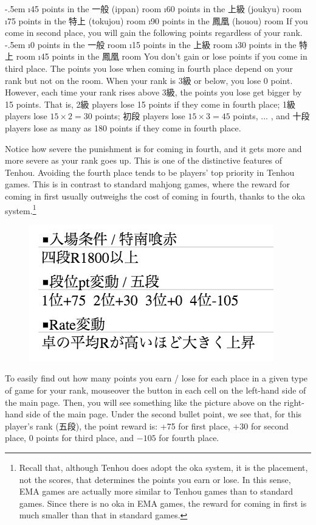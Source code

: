 \bi \itemsep-.5em
	\i 45 points in the 一般 ({\jap ippan}) room
	\i 60 points in the 上級 ({\jap joukyu}) room
	\i 75 points in the 特上 ({\jap tokujou}) room
	\i 90 points in the 鳳凰 ({\jap houou}) room
\ei
If you come in second place, you will gain the following points regardless of your rank.
	\bi \itemsep-.5em
	\i 0 points in the 一般 room
	\i 15 points in the 上級 room
	\i 30 points in the 特上 room
	\i 45 points in the 鳳凰 room
\ei
You don't gain or lose points if you come in third place. 
The points you lose when coming in fourth place depend on your rank but not on the room. When your rank is 3級 or below, you lose 0 point. However, each time your rank rises above 3級, the points you lose get bigger by 15 points. 
That is, 2級 players lose 15 points if they come in fourth place; 1級 players lose $15 \times 2 = 30$ points; 初段 players lose $15 \times 3 = 45$ points, ... , and 十段 players lose as many as 180 points if they come in fourth place.

\bigskip
Notice how severe the punishment is for coming in fourth, and it gets more and more severe as your rank goes up. This is one of the distinctive features of {\jap Tenhou}. 
Avoiding the fourth place tends to be players' top priority in {\jap Tenhou} games. This is in contrast to standard mahjong games, where the reward for coming in first usually outweighs the cost of coming in fourth, thanks to the {\jap oka} system.\footnote{Recall that, although {\jap Tenhou} does adopt the {\jap oka} system, it is the placement, not the scores, that determines the points you earn or lose. In this sense, EMA games are actually more similar to {\jap Tenhou} games than to standard games. Since there is no {\jap oka} in EMA games, the reward for coming in first is much smaller than that in standard games.} 

\bigskip

\begin{figure}
\vspace{-10pt}
\begin{center}
\includegraphics[width=.45\textwidth,clip]{figs/pt}
\end{center}
\vspace{-20pt}
\end{figure}
To easily find out how many points you earn / lose for each place in a given type of game for your rank, mouseover the  button in each cell on the left-hand side of the main page. Then, you will see something like the picture above on the right-hand side of the main page. Under the second bullet point, we see that, for this player's rank (五段), the point reward is: +75 for first place, +30 for second place, 0 points for third place, and $-105$ for fourth place. 

